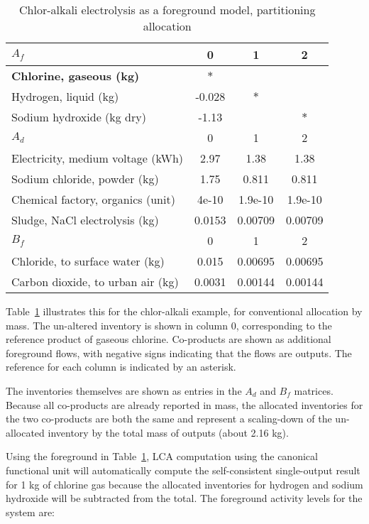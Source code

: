 \begin{table}
  \begin{center}
  \caption{Chlor-alkali electrolysis as a foreground model, partitioning allocation}
  \label{tbl:partition}
  \footnotesize\sffamily
  \begin{tabular}{l|ccc}
    \midrule
    \bf $A_f$ & 0 & 1 & 2 \\
    \midrule
    \textbf{Chlorine, gaseous (kg)} & $\ast$ & & \\
    Hydrogen, liquid (kg) & -0.028 & $\ast$ & \\
    Sodium hydroxide (kg dry) & -1.13 & & $\ast$ \\
    \midrule
    \bf $A_d$ & 0 & 1 & 2 \\
    \midrule
    Electricity, medium voltage (kWh) & 2.97 & 1.38 & 1.38 \\
    Sodium chloride, powder (kg) & 1.75 & 0.811 & 0.811 \\
    Chemical factory, organics (unit) & 4e-10 & 1.9e-10 & 1.9e-10 \\
    Sludge, NaCl electrolysis (kg) & 0.0153 & 0.00709 & 0.00709 \\
    \midrule
    \bf $B_f$ & 0 & 1 & 2 \\
    \midrule
    Chloride, to surface water (kg) & 0.015 & 0.00695 & 0.00695 \\
    Carbon dioxide, to urban air (kg) & 0.0031 & 0.00144 & 0.00144 \\
    \midrule
  \end{tabular}
  \end{center}
\end{table}
    

Table~\ref{tbl:partition} illustrates this for the chlor-alkali example, for conventional allocation by mass.  The un-altered inventory is shown in column $0$, corresponding to the reference product of gaseous chlorine.  Co-products are shown as additional foreground flows, with negative signs indicating that the flows are outputs.  The reference for each column is indicated by an asterisk.

The inventories themselves are shown as entries in the $A_d$ and $B_f$ matrices. Because all co-products are already reported in mass, the allocated inventories for the two co-products are both the same and represent a scaling-down of the un-allocated inventory by the total mass of outputs (about 2.16 kg).

Using the foreground in Table~\ref{tbl:partition}, LCA computation using the canonical functional unit will automatically compute the self-consistent single-output result for 1 kg of chlorine gas because the allocated inventories for hydrogen and sodium hydroxide will be subtracted from the total.  The foreground activity levels for the system are:

